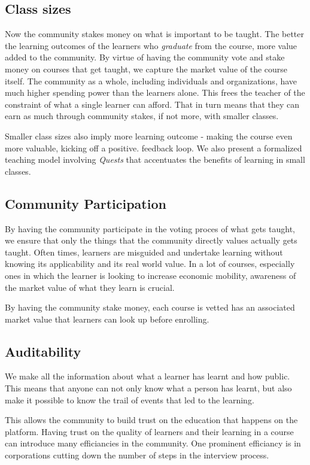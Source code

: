 \documentclass{article}
\begin{document}
    \subsection{Class sizes}
      Now the community stakes money on what is important to be taught. The better the learning outcomes of the learners who \textit{graduate} from the course, more value added to the community. By virtue of having the community vote and stake money on courses that get taught, we capture the market value of the course itself. The community as a whole, including individuals and organizations, have much higher spending power than the learners alone. This frees the teacher of the constraint of what a single learner can afford. That in turn means that they can earn as much through community stakes, if not more, with smaller classes.
      \par
      Smaller class sizes also imply more learning outcome \cite{classsize} - making the course even more valuable, kicking off a positive. feedback loop. We also present a formalized teaching model involving \textit{Quests} that accentuates the benefits of learning in small classes.
    \subsection{Community Participation}
      By having the community participate in the voting proces of what gets taught, we ensure that only the things that the community directly values actually gets taught. Often times, learners are misguided and undertake learning without knowing its applicability and its real world value. In a lot of courses, especially ones in which the learner is looking to increase economic mobility, awareness of the market value of what they learn is crucial.
      \par
      By having the community stake money, each course is vetted has an associated market value that learners can look up before enrolling. 
    \subsection{Auditability}
      We make all the information about what a learner has learnt and how public. This means that anyone can not only know what a person has learnt, but also make it possible to know the trail of events that led to the learning. 
      \par
      This allows the community to build trust on the education that happens on the platform.
      Having trust on the quality of learners and their learning in a course can introduce many efficiancies in the community. One prominent efficiancy is in corporations cutting down the number of steps in the interview process. \cite{lesserroundsfortopcolleges}
\end{document}
